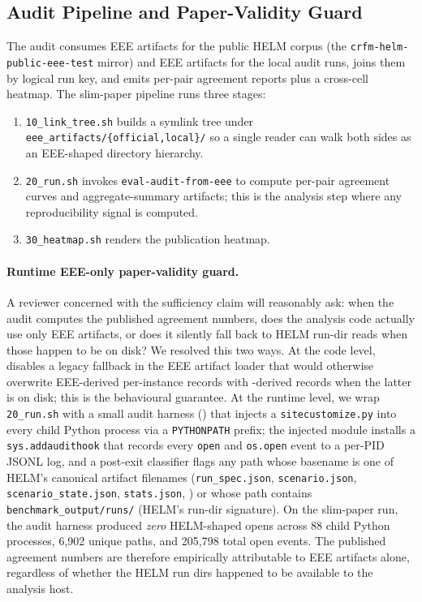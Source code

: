\subsection{Audit Pipeline and Paper-Validity Guard}
\label{sec:app-helm-pipeline-v2}

The audit consumes EEE artifacts for the public HELM corpus (the
  \texttt{crfm-helm-public-eee-test} mirror) and EEE artifacts for the
  local audit runs, joins them by logical run key, and emits per-pair
  agreement reports plus a cross-cell heatmap.
The slim-paper pipeline runs three stages:
\begin{enumerate}
  \item \texttt{10\_link\_tree.sh} builds a symlink tree under
        \texttt{eee\_artifacts/\{official,local\}/} so a single reader
        can walk both sides as an EEE-shaped directory hierarchy.
  \item \texttt{20\_run.sh} invokes \texttt{eval-audit-from-eee} to
        compute per-pair agreement curves and aggregate-summary
        artifacts; this is the analysis step where any reproducibility
        signal is computed.
  \item \texttt{30\_heatmap.sh} renders the publication heatmap.
\end{enumerate}

\paragraph{Runtime EEE-only paper-validity guard.}
A reviewer concerned with the \eee{} sufficiency claim will reasonably
  ask: when the audit computes the published agreement numbers, does
  the analysis code actually use only EEE artifacts, or does it
  silently fall back to HELM run-dir reads when those happen to be on
  disk?
We resolved this two ways.
At the code level,  disables a
  legacy fallback in the EEE artifact loader that would otherwise
  overwrite EEE-derived per-instance records with
  -derived records when the latter is
  on disk; this is the behavioural guarantee.
At the runtime level, we wrap \texttt{20\_run.sh} with a small audit
  harness
  () that injects a
  \texttt{sitecustomize.py} into every child Python process via a
  \texttt{PYTHONPATH} prefix; the injected module installs a
  \texttt{sys.addaudithook} that records every \texttt{open} and
  \texttt{os.open} event to a per-PID JSONL log, and a post-exit
  classifier flags any path whose basename is one of HELM's canonical
  artifact filenames (\texttt{run\_spec.json}, \texttt{scenario.json},
  \texttt{scenario\_state.json}, \texttt{stats.json},
  ) or whose path contains
  \texttt{benchmark\_output/runs/} (HELM's run-dir signature).
On the slim-paper run, the audit harness produced
  \emph{zero} HELM-shaped opens across 88 child Python processes,
  6{,}902 unique paths, and 205{,}798 total open events.
The published agreement numbers are therefore empirically attributable
  to EEE artifacts alone, regardless of whether the HELM run dirs
  happened to be available to the analysis host.

